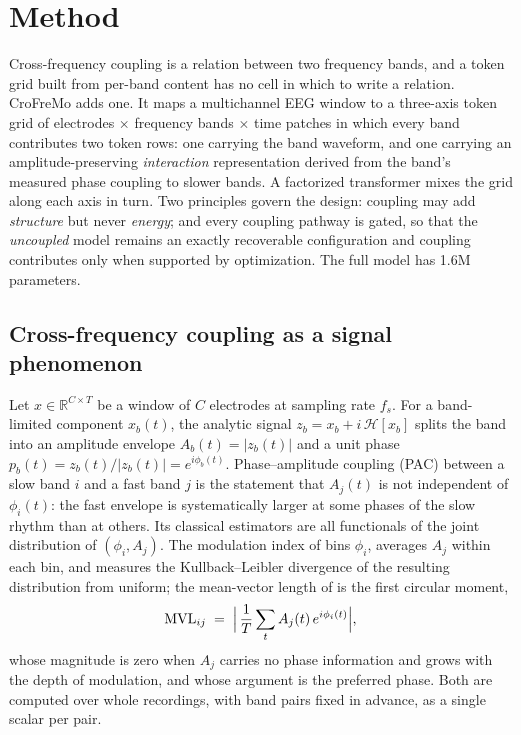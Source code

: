 \section{Method}
\label{sec:method}

Cross-frequency coupling is a relation between two frequency bands, and a
token grid built from per-band content has no cell in which to write a
relation. CroFreMo adds one. It maps a multichannel EEG window to a
three-axis token grid of electrodes $\times$ frequency bands $\times$ time
patches in which every band contributes two token rows: one carrying the
band waveform, and one carrying an amplitude-preserving \emph{interaction}
representation derived from the band's measured phase coupling to slower
bands. A factorized transformer mixes the grid along each axis in turn.
Two principles govern the design: coupling may add \emph{structure} but never
\emph{energy}; and every coupling pathway is gated, so that the
\emph{uncoupled} model remains an exactly recoverable configuration and
coupling contributes only when supported by optimization. The full model has
1.6M parameters.

\subsection{Cross-frequency coupling as a signal phenomenon}
\label{sec:phenomenon}

Let $x \in \mathbb{R}^{C \times T}$ be a window of $C$ electrodes at
sampling rate $f_s$. For a band-limited component $x_b(t)$, the analytic
signal $z_b = x_b + i\,\mathcal{H}[x_b]$ splits the band into an amplitude
envelope $A_b(t) = |z_b(t)|$ and a unit phase $p_b(t) = z_b(t)/|z_b(t)|
= e^{i\phi_b(t)}$. Phase--amplitude coupling (PAC) between a slow band $i$
and a fast band $j$ is the statement that $A_j(t)$ is not independent of
$\phi_i(t)$: the fast envelope is systematically larger at some phases of
the slow rhythm than at others. Its classical estimators are all functionals
of the joint distribution of $(\phi_i, A_j)$. The modulation index of
\citet{tort2010measuring} bins $\phi_i$, averages $A_j$ within each bin, and
measures the Kullback--Leibler divergence of the resulting distribution
from uniform; the mean-vector length of \citet{canolty2006high} is the
first circular moment,
\begin{equation}
\mathrm{MVL}_{ij} \;=\; \Bigl|\,\frac{1}{T}\sum_{t} A_j(t)\,e^{i\phi_i(t)}\Bigr| ,
\label{eq:mvl-classical}
\end{equation}
whose magnitude is zero when $A_j$ carries no phase information and grows
with the depth of modulation, and whose argument is the preferred phase.
Both are computed over whole recordings, with band pairs fixed in advance,
as a single scalar per pair.

